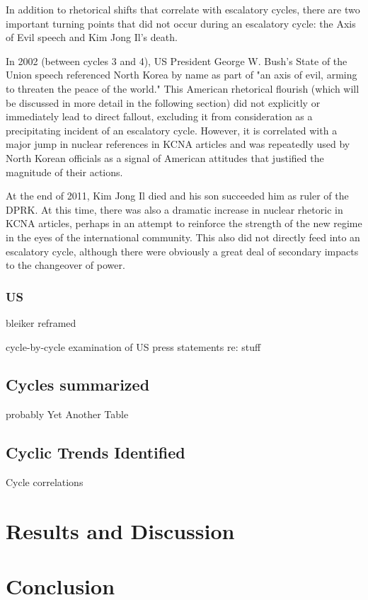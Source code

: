 \documentclass{article}
\begin{document}




In addition to rhetorical shifts that correlate with escalatory cycles, there are two important turning points that did not occur during an escalatory cycle: the Axis of Evil speech and Kim Jong Il's death.

In 2002 (between cycles 3 and 4), US President George W. Bush's State of the Union speech referenced North Korea by name as part of "an axis of evil, arming to threaten the peace of the world."\cite{sotu02} This American rhetorical flourish (which will be discussed in more detail in the following section) did not explicitly or immediately lead to direct fallout, excluding it from consideration as a precipitating incident of an escalatory cycle. However, it is correlated with a major jump in nuclear references in KCNA articles \cite{rich14} and was repeatedly used by North Korean officials as a signal of American attitudes that justified the magnitude of their actions\cite{bleiker}.

At the end of 2011, Kim Jong Il died and his son succeeded him as ruler of the DPRK. At this time, there was also a dramatic increase in nuclear rhetoric in KCNA articles, perhaps in an attempt to reinforce the strength of the new regime in the eyes of the international community\cite{rich14}. This also did not directly feed into an escalatory cycle, although there were obviously a great deal of secondary impacts to the changeover of power.


\subsubsection{US}
bleiker reframed

cycle-by-cycle examination of US press statements re: stuff


\subsection{Cycles summarized}
probably Yet Another Table

\subsection{Cyclic Trends Identified}
Cycle correlations

\section{Results and Discussion}

\section{Conclusion}




\todos
\end{document}
